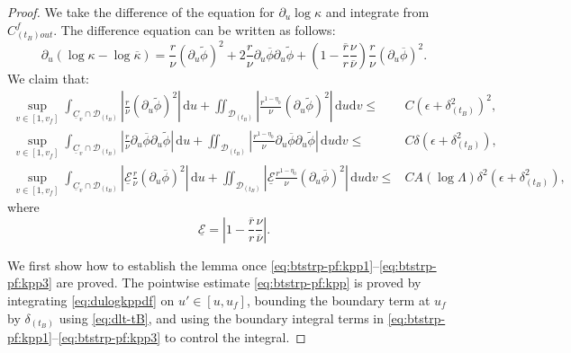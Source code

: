 \documentclass[10pt, reqno]{amsart}
\theoremstyle{definition}
\theoremstyle{remark}
\theoremstyle{conjecture}
\numberwithin{equation}{section}
\newcommand{\ud}{\mathrm{d}}
\newcommand{\rd}{\partial}
\newcommand{\0}{\emptyset}
\newcommand{\dlt}{\delta}
\newcommand{\eps}{\epsilon}
\newcommand{\kpp}{\kappa}
\newcommand{\lmb}{\lambda}
\newcommand{\Lmb}{\Lambda}
\newcommand{\calD}{\mathcal D}
\newcommand{\calE}{\mathcal E}
\newcommand{\uC}{\underline{C}}
\newcommand{\dur}{\nu}
\newcommand{\dvr}{\lmb}
\newcommand{\phibg}{\overline{\phi}}				%
\newcommand{\durbg}{\overline{\dur}}				%
\newcommand{\rbg}{\overline{r}}					%
\newcommand{\kppbg}{\overline{\kpp}}					%
\newcommand{\phidf}{\widetilde{\phi}}				%
\newcommand{\Abs}[1]{\left\vert #1 \right\vert}
\begin{document}
\begin{proof}
We take the difference of the equation for $\rd_{u} \log \kpp$ and integrate from $C_{(t_{B}) out}^{f}$. The difference equation can be written as follows:
\begin{equation} \label{eq:dulogkppdf}
	\rd_{u} (\log \kpp - \log \kppbg)
	= \frac{r}{\dur} (\rd_{u} \phidf)^{2} + 2 \frac{r}{\dur} \rd_{u} \phibg \rd_{u} \phidf 
	+ \left(1 - \frac{\rbg}{r} \frac{\dur}{\durbg} \right) \frac{r}{\dur} (\rd_{u} \phibg)^{2}.
\end{equation} 
We claim that:
\begin{align}
	\sup_{v \in [1, v_{f}]} \int_{\uC_{v} \cap \calD_{(t_{B})}} \Abs{\frac{r}{\dur} (\rd_{u} \phidf)^{2}}  \, \ud u
	+ \iint_{\calD_{(t_{B})}} \Abs{\frac{r^{1-\eta_{0}}}{\dur} (\rd_{u} \phidf)^{2} } \, \ud u \ud v
	\leq & C \left(\eps+ \dlt_{(t_{B})}^{2} \right)^{2}, 	\label{eq:btstrp-pf:kpp1} \\
	\sup_{v \in [1, v_{f}]} \int_{\uC_{v} \cap \calD_{(t_{B})}} \Abs{\frac{r}{\dur} \rd_{u} \phibg \rd_{u} \phidf} \, \ud u
	+ \iint_{\calD_{(t_{B})}} \Abs{\frac{r^{1-\eta_{0}}}{\dur} \rd_{u} \phibg \rd_{u} \phidf } \, \ud u \ud v
	\leq & C \dlt \left(\eps+ \dlt_{(t_{B})}^{2} \right), 		\label{eq:btstrp-pf:kpp2} \\
	\sup_{v \in [1, v_{f}]} \int_{\uC_{v} \cap \calD_{(t_{B})}} 
					\Abs{\underline{\calE} \frac{r}{\dur}(\rd_{u} \phibg)^{2}} \, \ud u
	+ \iint_{\calD_{(t_{B})}} 
					\Abs{\underline{\calE} \frac{r^{1-\eta_{0}}}{\dur}(\rd_{u} \phibg)^{2}}  \, \ud u \ud v
	\leq & C A (\log \Lmb) \dlt^{2} \left( \eps + \dlt_{(t_{B})}^{2} \right),		\label{eq:btstrp-pf:kpp3}
\end{align}
where
\begin{equation*}
	\underline{\calE} = \Abs{1 - \frac{\rbg}{r} \frac{\dur}{\durbg}}.
\end{equation*}

We first show how to establish the lemma once \eqref{eq:btstrp-pf:kpp1}--\eqref{eq:btstrp-pf:kpp3} are proved. The pointwise estimate \eqref{eq:btstrp-pf:kpp} is proved by integrating \eqref{eq:dulogkppdf} on $u' \in [u, u_{f}]$, bounding the boundary term at $u_{f}$ by $\dlt_{(t_{B})}$ using \eqref{eq:dlt-tB}, and using the boundary integral terms in \eqref{eq:btstrp-pf:kpp1}--\eqref{eq:btstrp-pf:kpp3} to control the integral. 


\end{proof}
\end{document}
